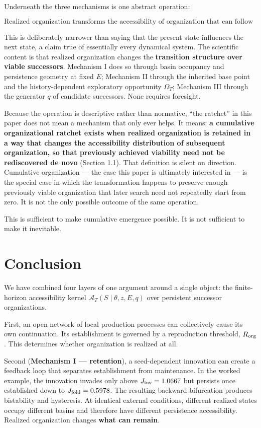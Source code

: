 \documentclass[11pt]{article}
\begin{document}
Underneath the three mechanisms is one abstract operation:

\[
\boxed{\text{Realized organization transforms the accessibility of organization that can follow it.}}
\]

This is deliberately narrower than saying that the present state
influences the next state, a claim true of essentially every dynamical
system. The scientific content is that realized organization changes the
\textbf{transition structure over viable successors}. Mechanism I does
so through basin occupancy and persistence geometry at fixed \(E\);
Mechanism II through the inherited base point and the history-dependent
exploratory opportunity \(\Omega_T\); Mechanism III through the
generator \(q\) of candidate successors. None requires foresight.

Because the operation is descriptive rather than normative, ``the
ratchet'' in this paper does not mean a mechanism that only ever helps.
It means: \textbf{a cumulative organizational ratchet exists when
realized organization is retained in a way that changes the
accessibility distribution of subsequent organization, so that
previously achieved viability need not be rediscovered de novo} (Section
1.1). That definition is silent on direction. Cumulative organization
--- the case this paper is ultimately interested in --- is the special
case in which the transformation happens to preserve enough previously
viable organization that later search need not repeatedly start from
zero. It is not the only possible outcome of the same operation.

This is sufficient to make cumulative emergence possible. It is not
sufficient to make it inevitable.

\section{Conclusion}
We have combined four layers of one argument around a single object: the
finite-horizon accessibility kernel \(\mathcal A_T(S\mid\theta,z,E,q)\)
over persistent successor organizations.

First, an open network of local production processes can collectively
cause its own continuation. Its establishment is governed by a
reproduction threshold, \(R_{\rm org}\). This determines whether
organization is realized at all.

Second (\textbf{Mechanism I --- retention}), a seed-dependent innovation
can create a feedback loop that separates establishment from
maintenance. In the worked example, the innovation invades only above
\(J_{\rm inv}=1.0667\) but persists once established down to
\(J_{\rm fold}=0.5978\). The resulting backward bifurcation produces
bistability and hysteresis. At identical external conditions, different
realized states occupy different basins and therefore have different
persistence accessibility. Realized organization changes \textbf{what
can remain}.
\end{document}
